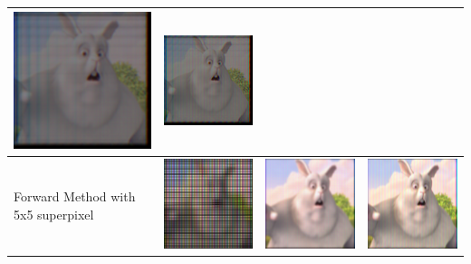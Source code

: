 \begin{table}[]
\begin{tabular}{| p{4 cm} | p{4cm} | p{4cm} | p{4cm} |}
         \includegraphics[width = 4 cm]{chapters/chapter9/images/simulation/Huang_allangle_pinhole_simulation.png} &  
         \includegraphics[width = 4 cm]{chapters/chapter9/images/simulation/Huang_allangle_lens_simulation.png} \\
    \hline Forward Method with 5x5 superpixel& \includegraphics[width = 4 cm]{chapters/chapter9/images/simulation/5x5_prefilter.png} &
         \includegraphics[width = 4 cm]{chapters/chapter9/images/simulation/5x5_pinhole_simulation.png} &  
         \includegraphics[width = 4 cm]{chapters/chapter9/images/simulation/5x5_lens_simulation.png} \\

\end{tabular}
\end{table}
